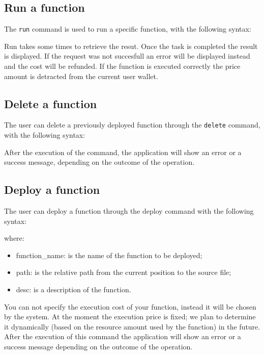 \subsection{Run a function}
The \texttt{run} command is used to run a specific function, with the following syntax: \\
\begin{center}
\end{center}
Run takes some times to retrieve the resut. Once the task is completed the result is displayed. If the request was not succesfull an error will be displayed instead and the cost will be refunded. If the function is executed correctly the price amount is detracted from the current user wallet.

\subsection{Delete a function}
The user can delete a previously deployed function through the \texttt{delete} command, with the following syntax:
\begin{center}
\end{center}
After the execution of the command, the application will show an error or a success message, depending on the outcome of the operation.

\subsection{Deploy a function}
The user can deploy a function through the deploy command with the following syntax:
\begin{center}
\end{center}
\noindent where:
\begin{itemize}
	\item function\_name: is the name of the function to be deployed;
	\item path: is the relative path from the current position to the source file;
	\item desc: is a description of the function.
\end{itemize}
You can not specify the execution cost of your function, instead it will be chosen by the system. At the moment the execution price is fixed; we plan to determine it dynamically (based on the resource amount used by the function) in the future. After the execution of this command  the application will show an error or a success message depending on the outcome of the operation.
